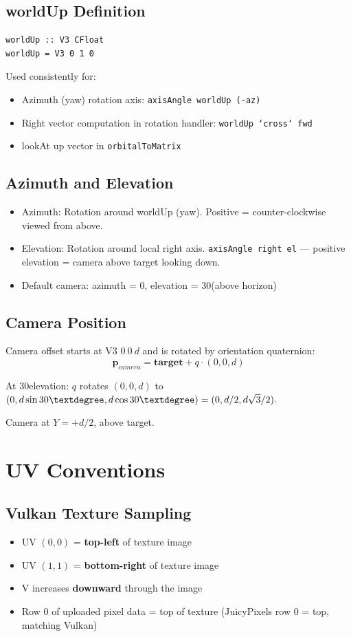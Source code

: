 \documentclass{article}
\begin{document}
\subsection{worldUp Definition}
\begin{verbatim}
worldUp :: V3 CFloat
worldUp = V3 0 1 0
\end{verbatim}

Used consistently for:
\begin{itemize}
\item Azimuth (yaw) rotation axis: \texttt{axisAngle worldUp (-az)}
\item Right vector computation in rotation handler: \texttt{worldUp `cross` fwd}
\item lookAt up vector in \texttt{orbitalToMatrix}
\end{itemize}

\subsection{Azimuth and Elevation}
\begin{itemize}
\item Azimuth: Rotation around worldUp (yaw). Positive = counter-clockwise viewed from above.
\item Elevation: Rotation around local right axis. \texttt{axisAngle right el} --- positive elevation = camera above target looking down.
\item Default camera: azimuth = 0\textdegree, elevation = 30\textdegree (above horizon)
\end{itemize}

\subsection{Camera Position}
Camera offset starts at $\text{V3 } 0\ 0\ d$ and is rotated by orientation quaternion:
\[
\mathbf{p}_{camera} = \mathbf{target} + q \cdot (0, 0, d)
\]

At 30\textdegree elevation: $q$ rotates $(0,0,d)$ to $(0, d \sin 30\textdegree, d \cos 30\textdegree) = (0, d/2, d\sqrt{3}/2)$.

Camera at $Y = +d/2$, above target. \checkmark

\section{UV Conventions}

\subsection{Vulkan Texture Sampling}
\begin{itemize}
\item UV $(0,0)$ = \textbf{top-left} of texture image
\item UV $(1,1)$ = \textbf{bottom-right} of texture image
\item V increases \textbf{downward} through the image
\item Row 0 of uploaded pixel data = top of texture (JuicyPixels row 0 = top, matching Vulkan)
\end{itemize}
\end{document}
